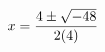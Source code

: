 \documentclass[preview]{standalone}
\begin{document}
\begin{align*}
\special{dvisvgm:raw <g id='unique000'>}x=\frac{4\pm\sqrt{-48}}{2(4)}\special{dvisvgm:raw </g>}
\end{align*}
\end{document}
